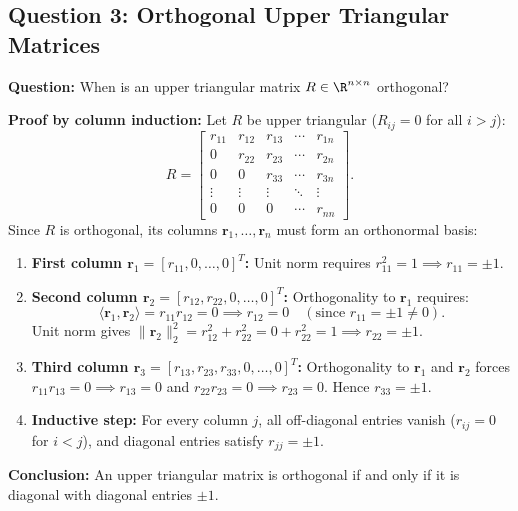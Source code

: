 \subsection{Question 3: Orthogonal Upper Triangular Matrices}

\begin{example}
\textbf{Question:} When is an upper triangular matrix $R \in \R^{n \times n}$ orthogonal?

\textbf{Proof by column induction:} Let $R$ be upper triangular ($R_{ij} = 0$ for all $i > j$):
\begin{equation}
    R = \begin{bmatrix}
        r_{11} & r_{12} & r_{13} & \cdots & r_{1n} \\
        0 & r_{22} & r_{23} & \cdots & r_{2n} \\
        0 & 0 & r_{33} & \cdots & r_{3n} \\
        \vdots & \vdots & \vdots & \ddots & \vdots \\
        0 & 0 & 0 & \cdots & r_{nn}
    \end{bmatrix}.
\end{equation}
Since $R$ is orthogonal, its columns $\mathbf{r}_1, \dots, \mathbf{r}_n$ must form an orthonormal basis:
\begin{enumerate}
    \item \textbf{First column $\mathbf{r}_1 = [r_{11}, 0, \dots, 0]^T$:}
    Unit norm requires $r_{11}^2 = 1 \implies r_{11} = \pm 1$.
    \item \textbf{Second column $\mathbf{r}_2 = [r_{12}, r_{22}, 0, \dots, 0]^T$:}
    Orthogonality to $\mathbf{r}_1$ requires:
    \begin{equation}
        \langle \mathbf{r}_1, \mathbf{r}_2 \rangle = r_{11} r_{12} = 0 \implies r_{12} = 0 \quad (\text{since } r_{11} = \pm 1 \neq 0).
    \end{equation}
    Unit norm gives $\|\mathbf{r}_2\|_2^2 = r_{12}^2 + r_{22}^2 = 0 + r_{22}^2 = 1 \implies r_{22} = \pm 1$.
    \item \textbf{Third column $\mathbf{r}_3 = [r_{13}, r_{23}, r_{33}, 0, \dots, 0]^T$:}
    Orthogonality to $\mathbf{r}_1$ and $\mathbf{r}_2$ forces $r_{11} r_{13} = 0 \implies r_{13} = 0$ and $r_{22} r_{23} = 0 \implies r_{23} = 0$. Hence $r_{33} = \pm 1$.
    \item \textbf{Inductive step:} For every column $j$, all off-diagonal entries vanish ($r_{ij} = 0$ for $i < j$), and diagonal entries satisfy $r_{jj} = \pm 1$.
\end{enumerate}
\textbf{Conclusion:} An upper triangular matrix is orthogonal if and only if it is diagonal with diagonal entries $\pm 1$.
\end{example}

